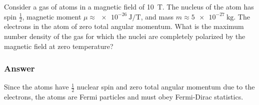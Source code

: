 Consider a gas of atoms in a magnetic field of \SI{10}{\tesla}. The nucleus of
the atom has spin $\frac{1}{2}$, magnetic moment $μ ≈ \SI{e-26}{\J\per\tesla}$,
and mass $m ≈ \SI{5e-27}{\kg}$. The electrons in the atom of zero total angular
momentum. What is the maximum number density of the gas for which the nuclei
are completely polarized by the magnetic field at zero temperature?

\subsubsection{Answer}
Since the atoms have $\frac{1}{2}$ nuclear spin and zero total angular momentum
due to the electrons, the atoms are Fermi particles and must obey Fermi-Dirac
statistics.
